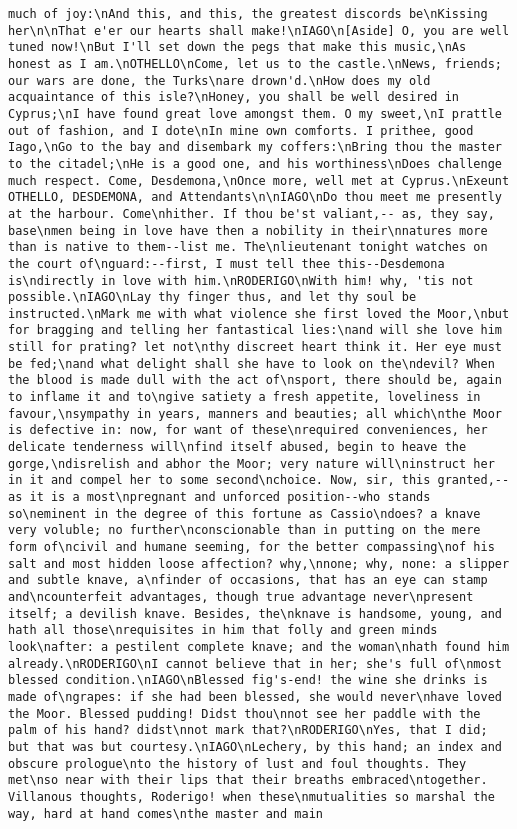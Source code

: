 \begin{verbatim}
much of joy:\nAnd this, and this, the greatest discords be\nKissing her\n\nThat e'er our hearts shall make!\nIAGO\n[Aside] O, you are well tuned now!\nBut I'll set down the pegs that make this music,\nAs honest as I am.\nOTHELLO\nCome, let us to the castle.\nNews, friends; our wars are done, the Turks\nare drown'd.\nHow does my old acquaintance of this isle?\nHoney, you shall be well desired in Cyprus;\nI have found great love amongst them. O my sweet,\nI prattle out of fashion, and I dote\nIn mine own comforts. I prithee, good Iago,\nGo to the bay and disembark my coffers:\nBring thou the master to the citadel;\nHe is a good one, and his worthiness\nDoes challenge much respect. Come, Desdemona,\nOnce more, well met at Cyprus.\nExeunt OTHELLO, DESDEMONA, and Attendants\n\nIAGO\nDo thou meet me presently at the harbour. Come\nhither. If thou be'st valiant,-- as, they say, base\nmen being in love have then a nobility in their\nnatures more than is native to them--list me. The\nlieutenant tonight watches on the court of\nguard:--first, I must tell thee this--Desdemona is\ndirectly in love with him.\nRODERIGO\nWith him! why, 'tis not possible.\nIAGO\nLay thy finger thus, and let thy soul be instructed.\nMark me with what violence she first loved the Moor,\nbut for bragging and telling her fantastical lies:\nand will she love him still for prating? let not\nthy discreet heart think it. Her eye must be fed;\nand what delight shall she have to look on the\ndevil? When the blood is made dull with the act of\nsport, there should be, again to inflame it and to\ngive satiety a fresh appetite, loveliness in favour,\nsympathy in years, manners and beauties; all which\nthe Moor is defective in: now, for want of these\nrequired conveniences, her delicate tenderness will\nfind itself abused, begin to heave the gorge,\ndisrelish and abhor the Moor; very nature will\ninstruct her in it and compel her to some second\nchoice. Now, sir, this granted,--as it is a most\npregnant and unforced position--who stands so\neminent in the degree of this fortune as Cassio\ndoes? a knave very voluble; no further\nconscionable than in putting on the mere form of\ncivil and humane seeming, for the better compassing\nof his salt and most hidden loose affection? why,\nnone; why, none: a slipper and subtle knave, a\nfinder of occasions, that has an eye can stamp and\ncounterfeit advantages, though true advantage never\npresent itself; a devilish knave. Besides, the\nknave is handsome, young, and hath all those\nrequisites in him that folly and green minds look\nafter: a pestilent complete knave; and the woman\nhath found him already.\nRODERIGO\nI cannot believe that in her; she's full of\nmost blessed condition.\nIAGO\nBlessed fig's-end! the wine she drinks is made of\ngrapes: if she had been blessed, she would never\nhave loved the Moor. Blessed pudding! Didst thou\nnot see her paddle with the palm of his hand? didst\nnot mark that?\nRODERIGO\nYes, that I did; but that was but courtesy.\nIAGO\nLechery, by this hand; an index and obscure prologue\nto the history of lust and foul thoughts. They met\nso near with their lips that their breaths embraced\ntogether. Villanous thoughts, Roderigo! when these\nmutualities so marshal the way, hard at hand comes\nthe master and main 
\end{verbatim}
